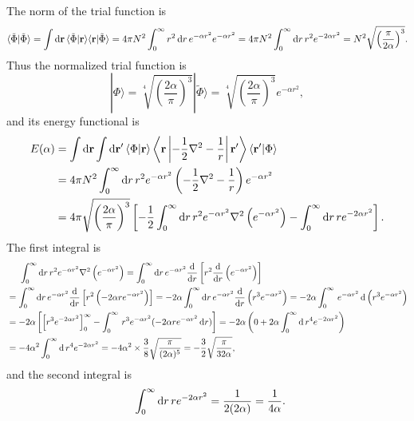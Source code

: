 \documentclass[a4paper]{book}
\newcounter{solution}[chapter]
\newcommand*{\dif}{\mathop{}\!\mathrm{d}}
\newcommand{\bfr}{{\bf r}}
\begin{document}
	\begin{solution}
	
	The norm of the trial function is
	\[
		\langle \tilde{\Phi} | \tilde{\Phi} \rangle = \int \dif \bfr \, \langle \tilde{\Phi} | \bfr \rangle \langle \bfr | \tilde{\Phi} \rangle = 4 \pi N^2 \int_0^{\infty} r^2 \dif r \, e^{-\alpha r^2} e^{-\alpha r^2} = 4 \pi N^2 \int_0^{\infty} \dif r \, r^2 e^{-2\alpha r^2} = N^2 \sqrt{ \left( \frac{\pi}{2\alpha} \right)^3 } .
	\]
	Thus the normalized trial function is
	\[
		| \Phi \rangle = \sqrt[4]{ \left( \frac{2\alpha}{\pi} \right)^3 } | \tilde{\Phi} \rangle = \sqrt[4]{ \left( \frac{2\alpha}{\pi} \right)^3 } e^{- \alpha r^2} ,
	\]
	and its energy functional is
	\begin{align*}
		E( \alpha ) &= \int \dif \bfr \int \dif \bfr^\prime \, \langle \Phi | \bfr \rangle \left\langle \bfr \left| -\frac 12 \nabla^2 - \frac{1}{r} \right| \bfr^\prime \right\rangle \langle \bfr^\prime | \Phi \rangle \\
		&= 4\pi N^2 \int_0^\infty \dif r \, r^2 e^{- \alpha r^2}  \left( -\frac 12 \nabla^2 - \frac{1}{r} \right) e^{- \alpha r^2}   \\
		&= 4\pi \sqrt{ \left( \frac{2\alpha}{\pi} \right)^3 } \left[ -\frac{1}{2} \int_0^\infty \dif r \, r^2 e^{- \alpha r^2} \nabla^2 \left( e^{- \alpha r^2} \right) - \int_0^\infty \dif r \, r e^{- 2 \alpha r^2} \right] .
	\end{align*}
	The first integral is
	\begin{align*}
		&\hspace{1.4em}\int_0^\infty \dif r \, r^2 e^{- \alpha r^2} \nabla^2 \left( e^{- \alpha r^2} \right) = \int_0^\infty \dif r \, e^{- \alpha r^2} \frac{ \dif }{ \dif r } \left[ r^2 \frac{ \dif }{ \dif r } \left( e^{- \alpha r^2} \right) \right] \\
		&= \int_0^\infty \dif r \, e^{- \alpha r^2} \frac{ \dif }{ \dif r } \left[ r^2 \left( -2 \alpha r e^{- \alpha r^2} \right) \right] = - 2 \alpha \int_0^\infty \dif r \, e^{- \alpha r^2} \frac{ \dif }{ \dif r } \left( r^3 e^{- \alpha r^2} \right) = - 2\alpha \int_0^\infty \, e^{- \alpha r^2} \dif \left( r^3 e^{- \alpha r^2} \right)  \\
		&= -2 \alpha \left[ \left[ r^3 e^{- 2\alpha r^2} \right]^\infty_0 - \int_0^\infty \, r^3 e^{- \alpha r^2} ( -2\alpha r e^{- \alpha r^2} \dif r ) \right] = -2 \alpha \left( 0 + 2\alpha \int_0^\infty \dif \, r^4 e^{-2\alpha r^2} \right) \\
		&= -4 \alpha^2 \int_0^\infty \dif \, r^4 e^{-2\alpha r^2} = -4 \alpha^2 \times \frac{3}{8} \sqrt{ \frac{ \pi }{ ( 2\alpha )^5 } } = - \frac{3}{2} \sqrt{ \frac{ \pi }{ 32 \alpha } } ,
	\end{align*}
	and the second integral is
	\begin{align*}
		&\hspace{1.4em} \int_0^\infty \dif r \, r e^{- 2 \alpha r^2} = \frac{1}{2(2\alpha)} = \frac{1}{4\alpha} .
	\end{align*}
	

\end{solution}
\end{document}

